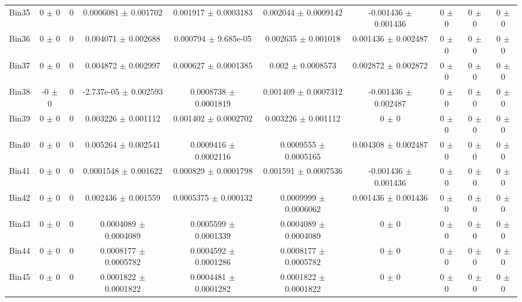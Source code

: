 \begin{tabular}{@{\extracolsep{4pt}}lccccccccc@{}}
     Bin35 & 0 $\pm$ 0 & 0 & 0.0006081 $\pm$ 0.001702 & 0.001917 $\pm$ 0.0003183 & 0.002044 $\pm$ 0.0009142 & -0.001436 $\pm$ 0.001436 & 0 $\pm$ 0 & 0 $\pm$ 0 & 0 $\pm$ 0 \\ 
     Bin36 & 0 $\pm$ 0 & 0 & 0.004071 $\pm$ 0.002688 & 0.000794 $\pm$ 9.685e-05 & 0.002635 $\pm$ 0.001018 & 0.001436 $\pm$ 0.002487 & 0 $\pm$ 0 & 0 $\pm$ 0 & 0 $\pm$ 0 \\ 
     Bin37 & 0 $\pm$ 0 & 0 & 0.004872 $\pm$ 0.002997 & 0.000627 $\pm$ 0.0001385 & 0.002 $\pm$ 0.0008573 & 0.002872 $\pm$ 0.002872 & 0 $\pm$ 0 & 0 $\pm$ 0 & 0 $\pm$ 0 \\ 
     Bin38 & -0 $\pm$ 0 & 0 & -2.737e-05 $\pm$ 0.002593 & 0.0008738 $\pm$ 0.0001819 & 0.001409 $\pm$ 0.0007312 & -0.001436 $\pm$ 0.002487 & 0 $\pm$ 0 & 0 $\pm$ 0 & 0 $\pm$ 0 \\ 
     Bin39 & 0 $\pm$ 0 & 0 & 0.003226 $\pm$ 0.001112 & 0.001402 $\pm$ 0.0002702 & 0.003226 $\pm$ 0.001112 & 0 $\pm$ 0 & 0 $\pm$ 0 & 0 $\pm$ 0 & 0 $\pm$ 0 \\ 
     Bin40 & 0 $\pm$ 0 & 0 & 0.005264 $\pm$ 0.002541 & 0.0009416 $\pm$ 0.0002116 & 0.0009555 $\pm$ 0.0005165 & 0.004308 $\pm$ 0.002487 & 0 $\pm$ 0 & 0 $\pm$ 0 & 0 $\pm$ 0 \\ 
     Bin41 & 0 $\pm$ 0 & 0 & 0.0001548 $\pm$ 0.001622 & 0.000829 $\pm$ 0.0001798 & 0.001591 $\pm$ 0.0007536 & -0.001436 $\pm$ 0.001436 & 0 $\pm$ 0 & 0 $\pm$ 0 & 0 $\pm$ 0 \\ 
     Bin42 & 0 $\pm$ 0 & 0 & 0.002436 $\pm$ 0.001559 & 0.0005375 $\pm$ 0.000132 & 0.0009999 $\pm$ 0.0006062 & 0.001436 $\pm$ 0.001436 & 0 $\pm$ 0 & 0 $\pm$ 0 & 0 $\pm$ 0 \\ 
     Bin43 & 0 $\pm$ 0 & 0 & 0.0004089 $\pm$ 0.0004089 & 0.0005599 $\pm$ 0.0001339 & 0.0004089 $\pm$ 0.0004089 & 0 $\pm$ 0 & 0 $\pm$ 0 & 0 $\pm$ 0 & 0 $\pm$ 0 \\ 
     Bin44 & 0 $\pm$ 0 & 0 & 0.0008177 $\pm$ 0.0005782 & 0.0004592 $\pm$ 0.0001286 & 0.0008177 $\pm$ 0.0005782 & 0 $\pm$ 0 & 0 $\pm$ 0 & 0 $\pm$ 0 & 0 $\pm$ 0 \\ 
     Bin45 & 0 $\pm$ 0 & 0 & 0.0001822 $\pm$ 0.0001822 & 0.0004481 $\pm$ 0.0001282 & 0.0001822 $\pm$ 0.0001822 & 0 $\pm$ 0 & 0 $\pm$ 0 & 0 $\pm$ 0 & 0 $\pm$ 0 \\ 
\hline\hline
  \end{tabular}
